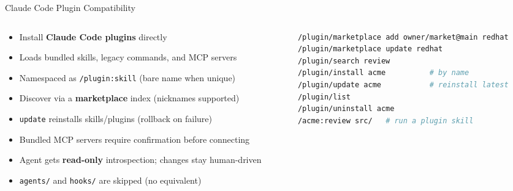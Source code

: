 \documentclass[aspectratio=169,10pt]{beamer}
\begin{document}
\begin{frame}[fragile]{Claude Code Plugin Compatibility}
\begin{columns}[T]
\begin{column}{0.48\textwidth}
\begin{itemize}\footnotesize
  \item Install \textbf{Claude Code plugins} directly
  \item Loads bundled skills, legacy commands, and MCP servers
  \item Namespaced as \texttt{/plugin:skill} (bare name when unique)
  \item Discover via a \textbf{marketplace} index (nicknames supported)
  \item \texttt{update} reinstalls skills/plugins (rollback on failure)
  \item Bundled MCP servers \alert{require confirmation} before connecting
  \item Agent gets \textbf{read-only} introspection; changes stay human-driven
  \item \texttt{agents/} and \texttt{hooks/} are skipped (no equivalent)
\end{itemize}
\end{column}
\begin{column}{0.48\textwidth}
\begin{lstlisting}[style=code,language=bash,basicstyle=\ttfamily\tiny,title={\scriptsize Plugin Management}]
/plugin/marketplace add owner/market@main redhat
/plugin/marketplace update redhat
/plugin/search review
/plugin/install acme          # by name
/plugin/update acme           # reinstall latest
/plugin/list
/plugin/uninstall acme
/acme:review src/   # run a plugin skill
\end{lstlisting}
\end{column}
\end{columns}
\end{frame}
\end{document}

